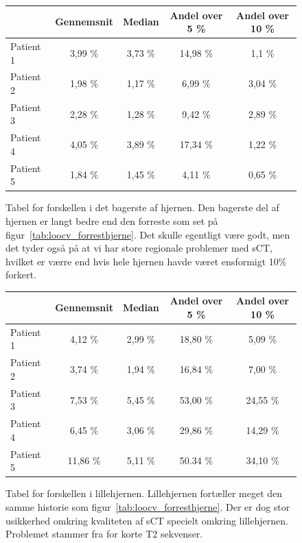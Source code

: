 \begin{figure}
    \centering
    \begin{tabular}{| l | c | c | c | c |}
        \hline
         & Gennemsnit & Median & Andel over 5 \% & Andel over 10 \% \\ \hline
        Patient 1 & 3,99 \% & 3,73 \% & 14,98 \% & 1,1 \% \\ \hline
        Patient 2 & 1,98 \% & 1,17 \% & 6,99 \% & 3,04 \% \\ \hline
        Patient 3 & 2,28 \% & 1,28 \% & 9,42 \% & 2,89 \% \\ \hline
        Patient 4 & 4,05 \% & 3,89 \% & 17,34 \% & 1,22 \% \\ \hline
        Patient 5 & 1,84 \% & 1,45 \% & 4,11 \% & 0,65 \% \\ \hline
    \end{tabular}
    \caption{Tabel for forskellen i det bagerste af hjernen. Den bagerste del af hjernen er langt bedre end den forreste som set på figur~\ref{tab:loocv_forresthjerne}. Det skulle egentligt være godt, men det tyder også på at vi har store regionale problemer med sCT, hvilket er værre end hvis hele hjernen havde været ensformigt 10\% forkert.}
    \label{tab:loocv_bagersthjerne}
\end{figure}

\begin{figure}
    \centering
    \begin{tabular}{| l | c | c | c | c |}
        \hline
         & Gennemsnit & Median & Andel over 5 \% & Andel over 10 \% \\ \hline
        Patient 1 & 4,12 \% & 2,99 \% & 18,80 \% & 5,09 \% \\ \hline
        Patient 2 & 3,74 \% & 1,94 \% & 16,84 \% & 7,00 \% \\ \hline
        Patient 3 & 7,53 \% & 5,45 \% & 53,00 \% & 24,55 \% \\ \hline
        Patient 4 & 6,45 \% & 3,06 \% & 29,86 \% & 14,29 \% \\ \hline
        Patient 5 & 11,86 \% & 5,11 \% & 50.34 \% & 34,10 \% \\ \hline
    \end{tabular}
    \caption{Tabel for forskellen i lillehjernen. Lillehjernen fortæller meget den samme historie som figur~\ref{tab:loocv_forresthjerne}. Der er dog stor usikkerhed omkring kvaliteten af sCT specielt omkring lillehjernen. Problemet stammer fra for korte T2 sekvenser.}
    \label{tab:loocv_lillehjerne}
\end{figure}


